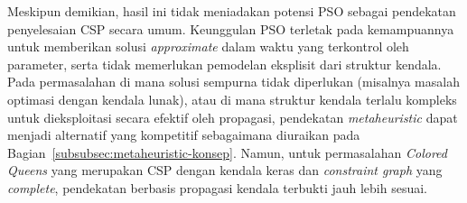 Meskipun demikian, hasil ini tidak meniadakan potensi PSO sebagai pendekatan penyelesaian CSP secara umum. Keunggulan PSO terletak pada kemampuannya untuk memberikan solusi \textit{approximate} dalam waktu yang terkontrol oleh parameter, serta tidak memerlukan pemodelan eksplisit dari struktur kendala. Pada permasalahan di mana solusi sempurna tidak diperlukan (misalnya masalah optimasi dengan kendala lunak), atau di mana struktur kendala terlalu kompleks untuk dieksploitasi secara efektif oleh propagasi, pendekatan \textit{metaheuristic} dapat menjadi alternatif yang kompetitif sebagaimana diuraikan pada Bagian~\ref{subsubsec:metaheuristic-konsep}. Namun, untuk permasalahan \textit{Colored Queens} yang merupakan CSP dengan kendala keras dan \textit{constraint graph} yang \textit{complete}, pendekatan berbasis propagasi kendala terbukti jauh lebih sesuai.